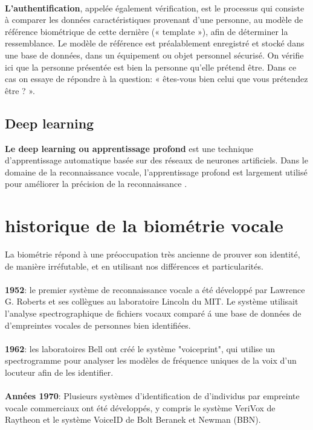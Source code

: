 \paragraph{}\textbf{L'authentification}, appelée également vérification, est le processus qui consiste à comparer les données caractéristiques provenant d'une personne, au modèle de référence biométrique de cette dernière (« template »), afin de déterminer la ressemblance. Le modèle de référence est préalablement enregistré et stocké dans une base de données, dans un équipement ou objet personnel sécurisé. On vérifie ici que la personne présentée est bien la personne qu'elle prétend être.
Dans ce cas on essaye de répondre à la question: « êtes-vous bien celui que vous prétendez être ? ».
\subsection {Deep learning}
\textbf{Le deep learning ou apprentissage profond}  est une technique d'apprentissage automatique basée sur des réseaux de neurones artificiels. Dans le domaine de la reconnaissance vocale, l'apprentissage profond est largement utilisé pour améliorer la précision de la reconnaissance \cite{embeddings}.


\section{historique de la biométrie vocale}
La biométrie répond à une préoccupation très ancienne de prouver son identité, de manière irréfutable, et en utilisant nos différences et particularités.
\paragraph{}\textbf{1952}: le premier système de reconnaissance vocale a été développé par Lawrence G. Roberts et ses collègues au laboratoire Lincoln du MIT. Le système utilisait l’analyse spectrographique de fichiers vocaux comparé á une base de données de d’empreintes vocales de personnes bien identifiées.
\paragraph{}\textbf{1962}: les laboratoires Bell ont créé le système "voiceprint", qui utilise un spectrogramme pour analyser les modèles de fréquence uniques de la voix d’un locuteur afin de les identifier. 
\paragraph{}\textbf{Années 1970}: Plusieurs systèmes d’identification de d’individus par empreinte vocale commerciaux ont été développés, y compris le système VeriVox de Raytheon et le système VoiceID de Bolt Beranek et Newman (BBN).
